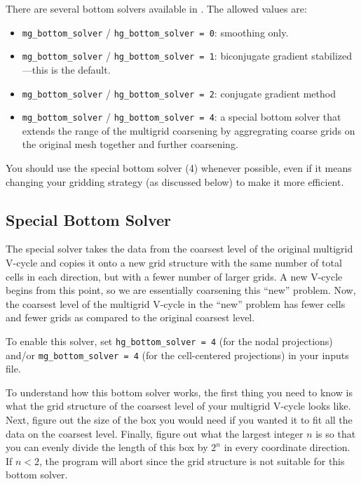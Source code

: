 There are several bottom solvers available in \FBoxLib.  
The allowed values are:
\begin{itemize}

\item {\tt mg\_bottom\_solver} / {\tt hg\_bottom\_solver = 0}: smoothing only.

\item {\tt mg\_bottom\_solver} / {\tt hg\_bottom\_solver = 1}: biconjugate
  gradient stabilized---this is the default.

\item {\tt mg\_bottom\_solver} / {\tt hg\_bottom\_solver = 2}: conjugate
  gradient method

\item {\tt mg\_bottom\_solver} / {\tt hg\_bottom\_solver = 4}: a special 
  bottom solver that extends the range of the multigrid coarsening
  by aggregrating coarse grids on the original mesh together and
  further coarsening.

\end{itemize}

You should use the special bottom solver (4) whenever possible, even
if it means changing your gridding strategy (as discussed below) to 
make it more efficient.


\subsection{Special Bottom Solver}

The special solver takes the data from the coarsest level of the
original multigrid V-cycle and copies it onto a new grid structure with
the same number of total cells in each direction, but with a fewer
number of larger grids.  A new V-cycle begins from this point, so we
are essentially coarsening this ``new'' problem.  Now, the coarsest
level of the multigrid V-cycle in the ``new'' problem has fewer cells
and fewer grids as compared to the original coarsest level.

To enable this solver, set {\tt hg\_bottom\_solver = 4} (for the nodal
projections) and/or {\tt mg\_bottom\_solver = 4} (for the
cell-centered projections) in your inputs file.

To understand how this bottom solver works, the first thing you need
to know is what the grid structure of the coarsest level of your
multigrid V-cycle looks like.  Next, figure out the size of the box you
would need if you wanted it to fit all the data on the coarsest level.
Finally, figure out what the largest integer $n$ is so that you can evenly
divide the length of this box by $2^n$ in every coordinate direction.
If $n < 2$, the program will abort since the grid structure is not
suitable for this bottom solver.

